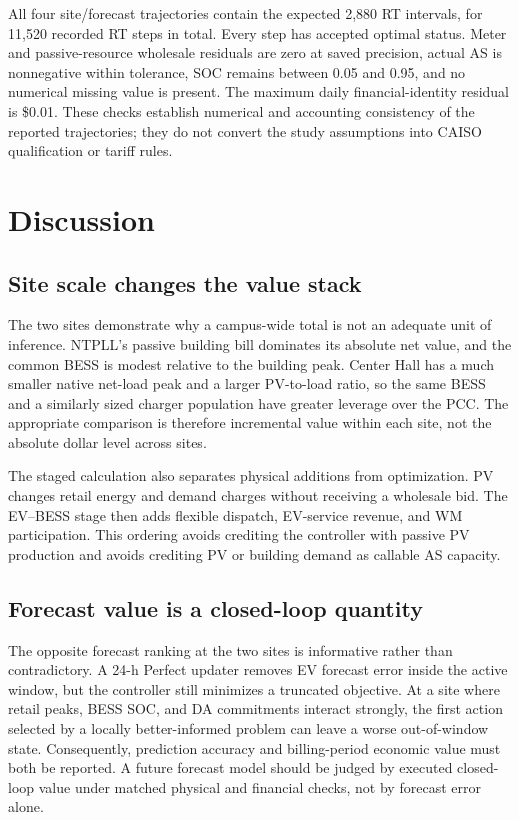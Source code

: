 \documentclass[final,5p,times]{elsarticle}
\begin{document}
All four site/forecast trajectories contain the expected 2,880 RT intervals, for 11,520 recorded RT steps in total. Every step has accepted optimal status. Meter and passive-resource wholesale residuals are zero at saved precision, actual AS is nonnegative within tolerance, SOC remains between 0.05 and 0.95, and no numerical missing value is present. The maximum daily financial-identity residual is \$0.01. These checks establish numerical
and accounting consistency of the reported trajectories; they do not convert the study assumptions into CAISO qualification or tariff rules.

\section{Discussion}
\label{sec:discussion}

\subsection{Site scale changes the value stack}

The two sites demonstrate why a campus-wide total is not an adequate unit of
inference. NTPLL's passive building bill dominates its absolute net value, and
the common BESS is modest relative to the building peak. Center Hall has a much
smaller native net-load peak and a larger PV-to-load ratio, so the same BESS and
a similarly sized charger population have greater leverage over the PCC. The
appropriate comparison is therefore incremental value within each site, not
the absolute dollar level across sites.

The staged calculation also separates physical additions from optimization.
PV changes retail energy and demand charges without receiving a wholesale bid.
The EV--BESS stage then adds flexible dispatch, EV-service revenue, and WM
participation. This ordering avoids crediting the controller with passive PV
production and avoids crediting PV or building demand as callable AS capacity.

\subsection{Forecast value is a closed-loop quantity}

The opposite forecast ranking at the two sites is informative rather than
contradictory. A 24-h Perfect updater removes EV forecast error inside the
active window, but the controller still minimizes a truncated objective. At a
site where retail peaks, BESS SOC, and DA commitments interact strongly, the
first action selected by a locally better-informed problem can leave a worse
out-of-window state. Consequently, prediction accuracy and billing-period
economic value must both be reported. A future forecast model should be judged
by executed closed-loop value under matched physical and financial checks, not
by forecast error alone.
\end{document}
